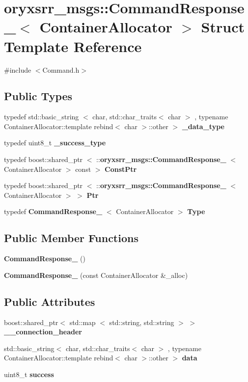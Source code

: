 \section{oryxsrr\-\_\-msgs\-:\-:\-Command\-Response\-\_\-$<$ \-Container\-Allocator $>$ \-Struct \-Template \-Reference}
\label{structoryxsrr__msgs_1_1CommandResponse__}


{\ttfamily \#include $<$\-Command.\-h$>$}

\subsection*{\-Public \-Types}
\begin{DoxyCompactItemize}
\item 
typedef std\-::basic\-\_\-string\*
$<$ char, std\-::char\-\_\-traits$<$ char $>$\*
, typename \*
\-Container\-Allocator\-::template \*
rebind$<$ char $>$\-::other $>$ {\bf \-\_\-data\-\_\-type}
\item 
typedef uint8\-\_\-t {\bf \-\_\-success\-\_\-type}
\item 
typedef boost\-::shared\-\_\-ptr\*
$<$ \-::{\bf oryxsrr\-\_\-msgs\-::\-Command\-Response\-\_\-}\*
$<$ \-Container\-Allocator $>$ const  $>$ {\bf \-Const\-Ptr}
\item 
typedef boost\-::shared\-\_\-ptr\*
$<$ \-::{\bf oryxsrr\-\_\-msgs\-::\-Command\-Response\-\_\-}\*
$<$ \-Container\-Allocator $>$ $>$ {\bf \-Ptr}
\item 
typedef {\bf \-Command\-Response\-\_\-}\*
$<$ \-Container\-Allocator $>$ {\bf \-Type}
\end{DoxyCompactItemize}
\subsection*{\-Public \-Member \-Functions}
\begin{DoxyCompactItemize}
\item 
{\bf \-Command\-Response\-\_\-} ()
\item 
{\bf \-Command\-Response\-\_\-} (const \-Container\-Allocator \&\-\_\-alloc)
\end{DoxyCompactItemize}
\subsection*{\-Public \-Attributes}
\begin{DoxyCompactItemize}
\item 
boost\-::shared\-\_\-ptr$<$ std\-::map\*
$<$ std\-::string, std\-::string $>$ $>$ {\bf \-\_\-\-\_\-connection\-\_\-header}
\item 
std\-::basic\-\_\-string$<$ char, \*
std\-::char\-\_\-traits$<$ char $>$\*
, typename \*
\-Container\-Allocator\-::template \*
rebind$<$ char $>$\-::other $>$ {\bf data}
\item 
uint8\-\_\-t {\bf success}
\end{DoxyCompactItemize}


